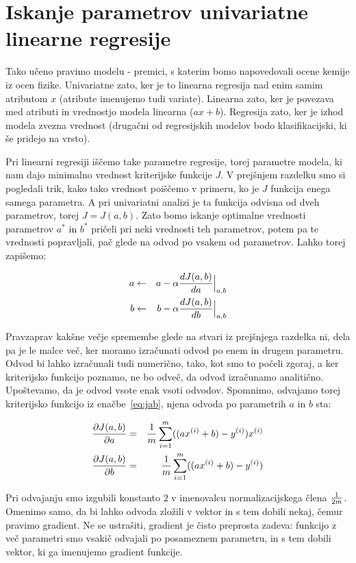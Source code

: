 \section{Iskanje parametrov univariatne linearne regresije}

Tako učeno pravimo modelu - premici, s katerim bomo napovedovali ocene
kemije iz ocen fizike. Univariatne zato, ker je to linearna regresija
nad enim samim atributom $x$ (atribute imenujemo tudi
variate). Linearna zato, ker je povezava med atributi in vrednostjo
modela linearna ($a x + b$). Regresija zato, ker je izhod modela
zvezna vrednost (drugačni od regresijskih modelov bodo
klasifikacijski, ki še pridejo na vrsto).

Pri linearni regresiji iščemo take parametre regresije, torej
parametre modela, ki nam dajo minimalno vrednost kriterijske funkcije
$J$. V prejšnjem razdelku smo si pogledali trik, kako tako vrednost
poiščemo v primeru, ko je $J$ funkcija enega samega parametra. A pri
univariatni analizi je ta funkcija odvisna od dveh parametrov, torej
$J=J(a,b)$. Zato bomo iskanje optimalne vrednosti parametrov $a^*$ in
$b^*$ pričeli pri neki vrednosti teh parametrov, potem pa te vrednosti
popravljali, pač glede na odvod po vsakem od parametrov. Lahko torej
zapišemo:

\begin{eqnarray}
a & \leftarrow & a - \alpha {dJ(a,b)\over da}\Bigr|_{a,b} \\
b & \leftarrow & b - \alpha {dJ(a,b)\over db}\Bigr|_{a,b}
\end{eqnarray}

Pravzaprav kakšne večje spremembe glede na stvari iz prejšnjega
razdelka ni, dela pa je le malce več, ker moramo izračunati odvod po
enem in drugem parametru. Odvod bi lahko izračunali tudi numerično,
tako, kot smo to počeli zgoraj, a ker kriterijsko funkcijo poznamo, ne
bo odveč, da odvod izračunamo analitično. Upoštevamo, da je odvod
vsote enak vsoti odvodov. Spomnimo, odvajamo torej kriterijsko
funkcijo iz enačbe~\ref{eq:jab}, njena odvoda po parametrih $a$ in $b$ sta:

\begin{eqnarray}
  {\partial J(a,b)\over\partial a} &=& {1\over m}\sum_{i=1}^m((a x^{(i)} + b)-y^{(i)})x^{(i)} \\
  {\partial J(a,b)\over\partial b} &=& {1\over m}\sum_{i=1}^m((a x^{(i)} + b)-y^{(i)})
\end{eqnarray}

Pri odvajanju smo izgubili konstanto $2$ v imenovalcu
normalizacijskega člena $1\over 2m$. Omenimo samo, da bi lahko odvoda
zložili v vektor in s tem dobili nekaj, čemur pravimo gradient. Ne se
ustrašiti, gradient je čisto preprosta zadeva: funkcijo z več parametri
smo vsakič odvajali po posameznem parametru, in s tem dobili vektor,
ki ga imenujemo gradient funkcije.

